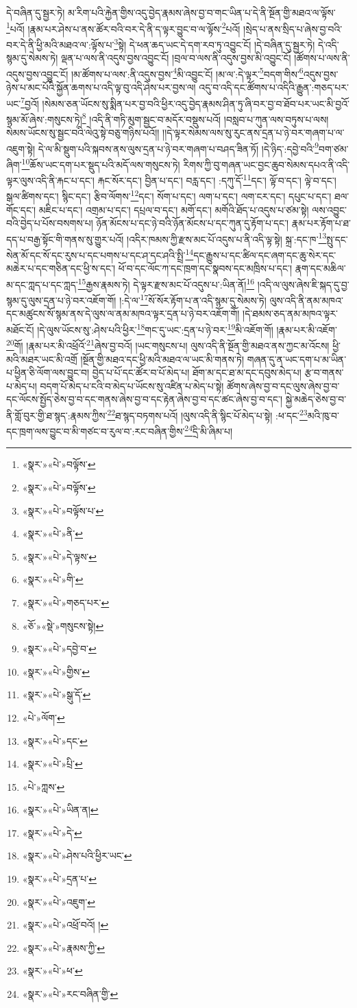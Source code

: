 དེ་བཞིན་དུ་སྦྱར་ཏེ། མ་རིག་པའི་རྐྱེན་གྱིས་འདུ་བྱེད་རྣམས་ཞེས་བྱ་བ་གང་ཡིན་པ་དེ་ནི་སྔོན་གྱི་མཐའ་ལ་ལྟོས་\footnote{«སྣར་»«པེ་»བལྟོས་}པའོ། །རྣམ་པར་ཤེས་པ་ནས་ཚོར་བའི་བར་དེ་ནི་ད་ལྟར་བྱུང་བ་ལ་ལྟོས་\footnote{«སྣར་»«པེ་»བལྟོས་}པའོ། །སྲེད་པ་ནས་སྲིད་པ་ཞེས་བྱ་བའི་བར་དེ་ནི་ཕྱི་མའི་མཐའ་ལ་:ལྟོས་པ་\footnote{«སྣར་»«པེ་»བལྟོས་པ་}སྟེ། དེ་ཕན་ཆད་ཡང་དེ་དག་རབ་ཏུ་འབྱུང་ངོ། །དེ་བཞིན་དུ་སྦྱར་ཏེ། དེ་འདི་སྙམ་དུ་སེམས་ཏེ། ལྡན་པ་ལས་ནི་འདུས་བྱས་འབྱུང་ངོ། །བྲལ་བ་ལས་ནི་འདུས་བྱས་མི་འབྱུང་ངོ། །ཚོགས་པ་ལས་ནི་འདུས་བྱས་འབྱུང་ངོ། །མ་ཚོགས་པ་ལས་:ནི་འདུས་བྱས་\footnote{«སྣར་»«པེ་»ནི་}མི་འབྱུང་ངོ། །མ་ལ་:དེ་ལྟར་\footnote{«སྣར་»«པེ་»དེ་ལྟས་}བདག་གིས་\footnote{«སྣར་»«པེ་»གི་}འདུས་བྱས་ཉེས་པ་མང་པོའི་སྐྱོན་ཆགས་པ་འདི་ལྟ་བུ་འདི་ཤེས་པར་བྱས་ལ། འདུ་བ་འདི་དང་ཚོགས་པ་འདིའི་རྒྱུན་:གཅད་པར་ཡང་\footnote{«སྣར་»«པེ་»གཅད་པར་}བྱའོ། །སེམས་ཅན་ཡོངས་སུ་སྨིན་པར་བྱ་བའི་ཕྱིར་འདུ་བྱེད་རྣམས་ཤིན་ཏུ་ཞི་བར་བྱ་བ་ཐོབ་པར་ཡང་མི་བྱའོ་སྙམ་མོ་ཞེས་:གསུངས་ཏེ།\footnote{«ཅོ་»«སྡེ་»གསུངས་སྟེ།} །འདི་ནི་གཏི་མུག་སྦྱང་བ་མདོར་བསྡུས་པའོ། །བསླབ་པ་ཀུན་ལས་བཏུས་པ་ལས། སེམས་ཡོངས་སུ་སྦྱང་བའི་ལེའུ་སྟེ་བཅུ་གཉིས་པའོ།། །།དེ་ལྟར་སེམས་ལས་སུ་རུང་ནས་དྲན་པ་ཉེ་བར་གཞག་པ་ལ་འཇུག་སྟེ། དེ་ལ་མི་སྡུག་པའི་སྐབས་ནས་ལུས་དྲན་པ་ཉེ་བར་གཞག་པ་བཤད་ཟིན་ཏོ། །དེ་ཉིད་:དབྱེ་བའི་\footnote{«སྣར་»«པེ་»དབྱེ་བ་}བག་ཙམ་ཞིག་\footnote{«སྣར་»«པེ་»གྱིས་}ཆོས་ཡང་དག་པར་སྡུད་པའི་མདོ་ལས་གསུངས་ཏེ། རིགས་ཀྱི་བུ་གཞན་ཡང་བྱང་ཆུབ་སེམས་དཔའ་ནི་འདི་ལྟར་ལུས་འདི་ནི་རྐང་པ་དང་། རྐང་སོར་དང་། བྱིན་པ་དང་། བརླ་དང་། :དཀུ་དོ་\footnote{«སྣར་»«པེ་»སྒུ་དོ་}དང་། ལྟོ་བ་དང་། ལྟེ་བ་དང་། སྒལ་ཚིགས་དང་། སྙིང་དང་། རྩིབ་ལོགས་\footnote{«པེ་»ལོག་}དང་། སོག་པ་དང་། ལག་པ་དང་། ལག་ངར་དང་། དཔུང་པ་དང་། ཐལ་གོང་དང་། མཇིང་པ་དང་། འགྲམ་པ་དང་། དཔྲལ་བ་དང་། མགོ་དང་། མགོའི་ཐོད་པ་འདུས་པ་ཙམ་སྟེ། ལས་འབྱུང་བའི་བྱེད་པ་པོས་བསགས་པ། ཉོན་མོངས་པ་དང་ཉེ་བའི་ཉོན་མོངས་པ་དང་ཀུན་དུ་རྟོག་པ་དང་། རྣམ་པར་རྟོག་པ་ཐ་དད་པ་བརྒྱ་སྟོང་གི་གནས་སུ་གྱུར་པའོ། །འདིར་ཁམས་ཀྱི་རྫས་མང་པོ་འདུས་པ་ནི་འདི་ལྟ་སྟེ། སྐྲ་:དང་ཁ་\footnote{«སྣར་»«པེ་»དང་}སྤུ་དང་སེན་མོ་དང་སོ་དང་རུས་པ་དང་པགས་པ་དང་ཤ་དང་ཤའི་སྤྲི་\footnote{«སྣར་»«པེ་»པྲི་}དང་རྒྱུས་པ་དང་ཚིལ་དང་ཞག་དང་ཆུ་སེར་དང་མཆེར་པ་དང་གཅིན་དང་ཕྱི་ས་དང་། ཕོ་བ་དང་ལོང་ཀ་དང་ཁྲག་དང་སྣབས་དང་མཁྲིས་པ་དང་། རྣག་དང་མཆིལ་མ་དང་ཀླད་པ་དང་ཀླད་\footnote{«པེ་»ཀླས་}རྒྱས་རྣམས་ཏེ། དེ་ལྟར་རྫས་མང་པོ་འདུས་པ་:ཡིན་ནོ།\footnote{«སྣར་»«པེ་»ཡིན་ན།} །འདི་ལ་ལུས་ཞེས་ཇི་སྐད་དུ་བྱ་སྙམ་དུ་ལུས་དྲན་པ་ཉེ་བར་འཇོག་གོ། །:དེ་ལ་\footnote{«སྣར་»«པེ་»དེ་}སོ་སོར་རྟོག་པ་ན་འདི་སྙམ་དུ་སེམས་ཏེ། ལུས་འདི་ནི་ནམ་མཁའ་དང་མཚུངས་སོ་སྙམ་ནས་དེ་ལུས་ལ་ནམ་མཁའ་ལྟར་དྲན་པ་ཉེ་བར་འཇོག་གོ། །དེ་ཐམས་ཅད་ནམ་མཁའ་ལྟར་མཐོང་ངོ། །དེ་ལུས་ཡོངས་སུ་:ཤེས་པའི་ཕྱིར་\footnote{«སྣར་»«པེ་»ཤེས་པའི་ཕྱིར་ཡང་}གང་དུ་ཡང་:དྲན་པ་ཉེ་བར་\footnote{«སྣར་»«པེ་»དྲན་པ་}མི་འཇོག་གོ། །རྣམ་པར་མི་འཇོག་\footnote{«སྣར་»«པེ་»འཇུག་}གོ། །རྣམ་པར་མི་འཕྲོའོ་\footnote{«སྣར་»«པེ་»འཕྲོ་བའོ། །}ཞེས་བྱ་བའོ། །ཡང་གསུངས་པ། ལུས་འདི་ནི་སྔོན་གྱི་མཐའ་ནས་ཀྱང་མ་འོངས། ཕྱི་མའི་མཐར་ཡང་མི་འགྲོ །སྔོན་གྱི་མཐའ་དང་ཕྱི་མའི་མཐའ་ལ་ཡང་མི་གནས་ཏེ། གཞན་དུ་ན་ཡང་དག་པ་མ་ཡིན་པ་ཕྱིན་ཅི་ལོག་ལས་བྱུང་བ། བྱེད་པ་པོ་དང་ཚོར་བ་པོ་མེད་པ། ཐོག་མ་དང་ཐ་མ་དང་དབུས་མེད་པ། རྩ་བ་གནས་པ་མེད་པ། བདག་པོ་མེད་པ་ངའི་བ་མེད་པ་ཡོངས་སུ་འཛིན་པ་མེད་པ་སྟེ། ཚོགས་ཞེས་བྱ་བ་དང་ལུས་ཞེས་བྱ་བ་དང་ལོངས་སྤྱོད་ཅེས་བྱ་བ་དང་གནས་ཞེས་བྱ་བ་དང་རྟེན་ཞེས་བྱ་བ་དང་ཚང་ཞེས་བྱ་བ་དང་། སྐྱེ་མཆེད་ཅེས་བྱ་བ་ནི་གློ་བུར་གྱི་ཐ་སྙད་:རྣམས་ཀྱིས་\footnote{«སྣར་»«པེ་»རྣམས་ཀྱི་}ཐ་སྙད་བཏགས་པའོ། །ལུས་འདི་ནི་སྙིང་པོ་མེད་པ་སྟེ། :ཕ་དང་\footnote{«སྣར་»«པེ་»ཕ་}མའི་ཁུ་བ་དང་ཁྲག་ལས་བྱུང་བ་མི་གཙང་བ་རུལ་བ་:རང་བཞིན་གྱིས་\footnote{«སྣར་»«པེ་»རང་བཞིན་གྱི་}དྲི་མི་ཞིམ་པ། 